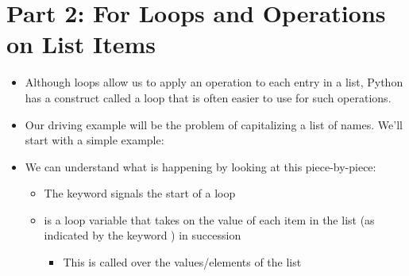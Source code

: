 \documentclass[letterpaper,10pt,english]{sphinxmanual}
\begin{document}
\section{Part 2:  For Loops and Operations on List Items}
\label{\detokenize{lecture_notes/lec10_lists2:part-2-for-loops-and-operations-on-list-items}}\begin{itemize}
\item {} 
Although  loops allow us to apply an operation to each entry in a list,
Python has a construct called a  loop that is often easier
to use for such operations.

\item {} 
Our driving example will be the problem of capitalizing a list of
names.  We’ll start with a simple example:

%
\begin{sphinxVerbatim}[commandchars=\\\{\}]
  \PYG{p}{[}    \PYG{p}{]}
  \PYG{p}{[}\PYG{p}{]}
   
      
\end{sphinxVerbatim}

\item {} 
We can understand what is happening by looking at this
piece-by-piece:
\begin{itemize}
\item {} 
The keyword  signals the start of a loop

\item {} 
 is a loop variable that takes on the value of each item
in the list (as indicated by the keyword ) in
succession
\begin{itemize}
\item {} 
This is called  over the values/elements of the list


\end{itemize}
\end{itemize}
\end{itemize}
\end{document}
